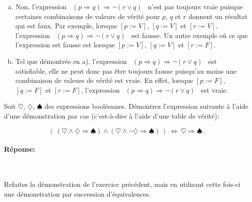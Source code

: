 \documentclass[12pt]{article}
\newcommand{\non}{\neg}                  %
\newcommand{\et}{\wedge}                 %
\newcommand{\ou}{\vee}                   %
\newcommand{\implique}{\Rightarrow}      %
\newcommand{\ssi}{\Leftrightarrow}       %
\newcounter{exercice}\newcommand{\exercice}{\bigskip \addtocounter{exercice}{1}\noindent \textbf{Exercice \theexercice}\\}
\begin{document}
\begin{enumerate}[a)]
\item \noindent Non, l'expression \guillemotleft ~$(p \implique q) \implique \neg (r \ou q)$ \guillemotright ~n'est pas toujours vraie puisque certaines combinaisons de valeurs de vérité pour $p$, $q$ et $r$ donnent un résultat qui est faux. Par exemple, lorsque $[p:=V]$, $[q:=V]$ et $[r:=V]$, l'expression \guillemotleft ~$(p \implique q) \implique \neg (r \ou q)$ \guillemotright ~est fausse. Un autre exemple où ce que l'expression est fausse est lorsque $[p:=V]$, $[q:=V]$ et $[r:=F]$.\\

\item \noindent Tel que démontrée en a), l'expression \guillemotleft ~$(p \implique q) \implique \neg (r \ou q)$ \guillemotright ~est satisfiable, elle ne peut donc pas être toujours fausse puisqu'au moins une combinaison de valeurs de vérité est vraie. En effet, lorsque $[p:=F]$, $[q:=F]$ et $[r:=F]$, l'expression \guillemotleft ~$(p \implique q) \implique \neg (r \ou q)$ \guillemotright ~est vraie.
\end{enumerate}




\newpage


\exercice 
Soit $\heartsuit$, $\diamondsuit$, $\spadesuit$ des expressions booléennes.%
 Démontrez l'expression suivante à l'aide d'une démonstration par cas (c'est-à-dire à l'aide d'une table de vérité):

$$ (\,(\heartsuit \et \diamondsuit \implique \spadesuit) \et (\heartsuit \et \non \diamondsuit \implique \spadesuit)\,) \ \ssi \ \heartsuit \implique \spadesuit\,.$$ 

\paragraph{Réponse:}~\\


\newpage

\exercice Refaites la démonstration de l'exercice précédent, mais en utilisant cette fois-ci une démonstration par succession d'équivalences.
\end{document}
